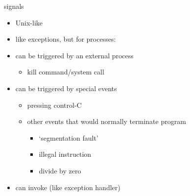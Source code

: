 \usetikzlibrary{shapes.callouts,positioning}

\begin{frame}{signals}
\begin{itemize}
\item Unix-like 
\item like exceptions, but for processes:
\vspace{.5cm}
\item can be triggered by an external process
    \begin{itemize}
    \item kill command/system call
    \end{itemize}
\item can be triggered by special events
    \begin{itemize}
    \item pressing control-C
    \item other events that would normally terminate program
        \begin{itemize}
        \item `segmentation fault'
        \item illegal instruction
        \item divide by zero
        \end{itemize}
    \end{itemize}
\item can invoke  (like exception handler)
\end{itemize}
\end{frame}

